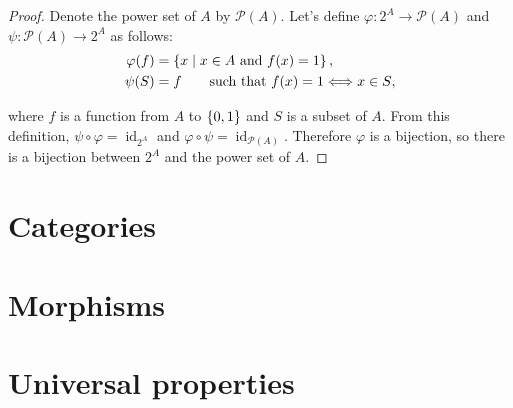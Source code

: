 \begin{proof}
	Denote the power set of $A$ by $\mathscr{P}(A)$. Let's define $\varphi: 2^{A}\to \mathscr{P}(A)$ and $\psi: \mathscr{P}(A)\to 2^{A}$ as follows:
	\begin{align*}
		\varphi(f) & = \left\{{x \mid x\in A \text{ and } f(x) = 1}\right\},                      \\
		\psi(S)    & = f \qquad\text{such that $f(x) = 1 \Longleftrightarrow x\in S$},
	\end{align*}

	where $f$ is a function from $A$ to $\left\{{0, 1}\right\}$ and $S$ is a subset of $A$. From this definition, $\psi\circ\varphi = \operatorname{id}_{2^{A}}$ and $\varphi\circ\psi = \operatorname{id}_{\mathscr{P}(A)}$. Therefore $\varphi$ is a bijection, so there is a bijection between $2^{A}$ and the power set of $A$.
\end{proof}

\section{Categories}


\section{Morphisms}


\section{Universal properties}

